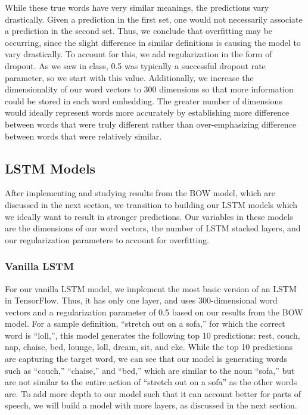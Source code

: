 \documentclass{article} %
\begin{document}
While these true words have very similar meanings, the predictions vary drastically. Given a prediction in the first set, one would not necessarily associate a prediction in the second set. 
Thus, we conclude that overfitting may be occurring, since the slight difference in similar definitions is causing the model to vary drastically. To account for this, we add regularization in the form of dropout. As we saw in class, 0.5 was typically a successful dropout rate parameter, so we start with this value.
Additionally, we increase the dimensionality of our word vectors to 300 dimensions so that more information could be stored in each word embedding. The greater number of dimensions would ideally represent words more accurately by establishing more difference between words that were truly different rather than over-emphasizing difference between words that were relatively similar. 

\subsection{LSTM Models}
After implementing and studying results from the BOW model, which are discussed in the next section, we transition to building our LSTM models which we ideally want to result in stronger predictions. Our variables in these models are the dimensions of our word vectors, the number of LSTM stacked layers, and our regularization parameters to account for overfitting. 

\subsubsection{Vanilla LSTM}
For our vanilla LSTM model, we implement the most basic version of an LSTM in TensorFlow. Thus, it has only one layer, and uses 300-dimensional word vectors and a regularization parameter of 0.5 based on our results from the BOW model.
For a sample definition, “stretch out on a sofa,” for which the correct word is “loll,”, this model generates the following top 10 predictions: rest, couch, nap, chaise, bed, lounge, loll, dream, sit, and eke.
While the top 10 predictions are capturing the target word, we can see that our model is generating words such as “couch,” “chaise,” and “bed,” which are similar to the noun “sofa,” but are not similar to the entire action of “stretch out on a sofa” as the other words are. To add more depth to our model such that it can account better for parts of speech, we will build a model with more layers, as discussed in the next section.
\end{document}
